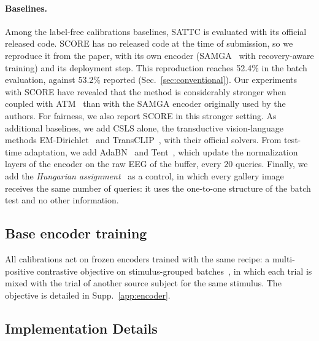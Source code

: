 \documentclass[10pt,twocolumn,letterpaper]{article}
\begin{document}
\paragraph{Baselines.}
Among the label-free calibrations baselines, SATTC is evaluated with its official released code. SCORE has no released code at the time of submission, so we reproduce it from the paper, with its own encoder (SAMGA~\cite{jiang2026samga} with recovery-aware training) and its deployment step. This reproduction reaches 52.4\% in the batch evaluation, against 53.2\% reported (Sec.~\ref{sec:conventional}). Our experiments with SCORE have revealed that the method is considerably stronger when coupled with ATM~\cite{li2024atm} than with the SAMGA encoder originally used by the authors. For fairness, we also report SCORE in this stronger setting. As additional baselines, we add CSLS alone, the transductive vision-language methods EM-Dirichlet~\cite{martin2024transductive} and TransCLIP~\cite{zanella2024transclip}, with their official solvers. From test-time adaptation, we add AdaBN~\cite{li2018adabn} and Tent~\cite{wang2021tent}, which update the normalization layers of the encoder on the raw EEG of the buffer, every 20 queries. Finally, we add the \emph{Hungarian assignment}~\cite{kuhn1955hungarian} as a control, in which every gallery image receives the same number of queries: it uses the one-to-one structure of the batch test and no other information.

\subsection{Base encoder training}
\label{sec:encoder}

All calibrations act on frozen encoders trained with the same recipe: a multi-positive contrastive objective on stimulus-grouped batches~\cite{khosla2020supcon}, in which each trial is mixed with the trial of another source subject for the same stimulus. The objective is detailed in Supp.~\ref{app:encoder}.

\subsection{Implementation Details}
\label{sec:implementation}
\end{document}
